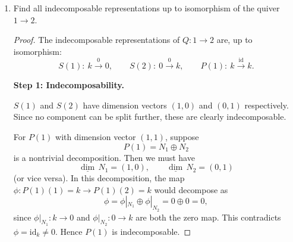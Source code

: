 \documentclass[11pt, a4paper]{article}
\begin{document}
\begin{enumerate}[leftmargin=*, label=\textbf{\arabic*.}]
\begin{enumerate}[label=(\alph*)]
\begin{proof}
    $p$ is surjective: $p_1=\mathrm{id}_k$ is surjective, and $p_2\colon k\to 0$, $p_3\colon 0\to 0$ are trivially surjective.
    
    Exactness at $P(1)$: we verify $\ker p = \operatorname{im}\iota$ at each vertex.
    \begin{itemize}
    \item Vertex~$1$: $\ker(\mathrm{id}_k)=0=\operatorname{im}(0)$.
    \item Vertex~$2$: $\ker(0\colon k\to 0)=k=\operatorname{im}(\mathrm{id}_k)$.
    \item Vertex~$3$: both are $0$.
    \end{itemize}
    
    Hence
    \[
    0 \longrightarrow S(2) \xrightarrow{\;\iota\;} P(1) \xrightarrow{\;p\;} S(1) \longrightarrow 0
    \]
    is a short exact sequence.
    
    \medskip\noindent\textbf{Non-split.}
    If the sequence splits, then
    \[
    P(1) \cong S(1) \oplus S(2).
    \]
    However, the direct sum $S(1)\oplus S(2) = (k,\,k,\,0)$ has map $0\oplus 0 = 0$ at arrow $1\to 2$, while $P(1)$ has map $\mathrm{id}_k\neq 0$. This is a contradiction, so the sequence does not split.
    \end{proof}
\end{enumerate}

\item Find all indecomposable representations up to isomorphism of the quiver $1 \rightarrow 2$.

\begin{proof}
The indecomposable representations of $Q\colon 1\to 2$ are, up to isomorphism:
\[
S(1)\colon\ k \xrightarrow{0} 0,\qquad S(2)\colon\ 0 \xrightarrow{0} k,\qquad P(1)\colon\ k \xrightarrow{\mathrm{id}} k.
\]

\medskip\noindent\textbf{Step 1: Indecomposability.}

$S(1)$ and $S(2)$ have dimension vectors $(1,0)$ and $(0,1)$ respectively. Since no component can be split further, these are clearly indecomposable.

For $P(1)$ with dimension vector $(1,1)$, suppose
\[
P(1) = N_1 \oplus N_2
\]
is a nontrivial decomposition. Then we must have
\[
\underline{\dim}\,N_1 = (1,0),\qquad \underline{\dim}\,N_2 = (0,1)
\]
(or vice versa). In this decomposition, the map $\phi\colon P(1)(1)=k \to P(1)(2)=k$ would decompose as
\[
\phi = \phi|_{N_1} \oplus \phi|_{N_2} = 0 \oplus 0 = 0,
\]
since $\phi|_{N_1}\colon k \to 0$ and $\phi|_{N_2}\colon 0 \to k$ are both the zero map. This contradicts $\phi=\mathrm{id}_k\neq 0$. Hence $P(1)$ is indecomposable.


\end{proof}
\end{enumerate}
\end{document}

